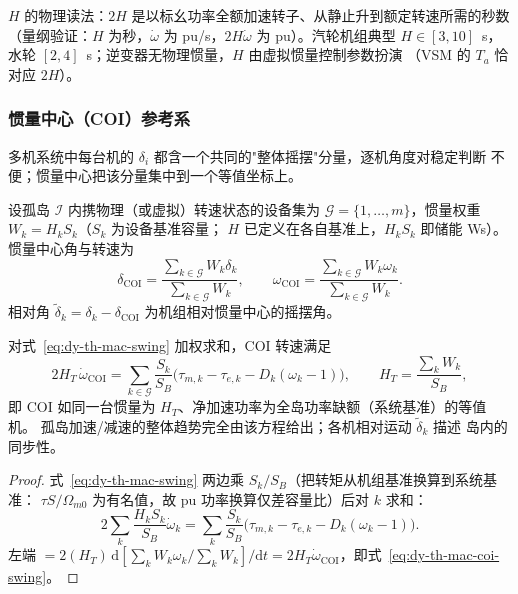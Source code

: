 $H$ 的物理读法：$2H$ 是以标幺功率全额加速转子、从静止升到额定转速所需的秒数
（量纲验证：$H$ 为秒，$\dot\omega$ 为 pu/s，$2H\dot\omega$ 为 pu）。汽轮机组典型
$H\in[3,10]$~s，水轮 $[2,4]$~s；逆变器无物理惯量，$H$ 由虚拟惯量控制参数扮演
（VSM 的 $T_a$ 恰对应 $2H$）。

\subsubsection{惯量中心（COI）参考系}

多机系统中每台机的 $\delta_i$ 都含一个共同的"整体摇摆"分量，逐机角度对稳定判断
不便；惯量中心把该分量集中到一个等值坐标上。

\begin{definition}[惯量中心]\label{def:dy-th-mac-coi}
设孤岛 $\mathcal I$ 内携物理（或虚拟）转速状态的设备集为
$\mathcal G=\{1,\dots,m\}$，惯量权重 $W_k=H_kS_k$（$S_k$ 为设备基准容量；
$H$ 已定义在各自基准上，$H_kS_k$ 即储能 Ws）。惯量中心角与转速为
\begin{equation}
\delta_{\mathrm{COI}}=\frac{\sum_{k\in\mathcal G}W_k\delta_k}{\sum_{k\in\mathcal G}W_k},
\qquad
\omega_{\mathrm{COI}}=\frac{\sum_{k\in\mathcal G}W_k\omega_k}{\sum_{k\in\mathcal G}W_k}.
\label{eq:dy-th-mac-coi}
\end{equation}
相对角 $\tilde\delta_k=\delta_k-\delta_{\mathrm{COI}}$ 为机组相对惯量中心的摇摆角。
\end{definition}

\begin{proposition}\label{prop:dy-th-mac-coi-swing}
对式~\eqref{eq:dy-th-mac-swing} 加权求和，COI 转速满足
\begin{equation}
2H_T\,\dot\omega_{\mathrm{COI}}
=\sum_{k\in\mathcal G}\frac{S_k}{S_B}\bigl(\tau_{m,k}-\tau_{e,k}-D_k(\omega_k-1)\bigr),
\qquad
H_T=\frac{\sum_kW_k}{S_B},
\label{eq:dy-th-mac-coi-swing}
\end{equation}
即 COI 如同一台惯量为 $H_T$、净加速功率为全岛功率缺额（系统基准）的等值机。
孤岛加速/减速的整体趋势完全由该方程给出；各机相对运动 $\tilde\delta_k$ 描述
岛内的同步性。
\end{proposition}

\begin{proof}
式~\eqref{eq:dy-th-mac-swing} 两边乘 $S_k/S_B$（把转矩从机组基准换算到系统基准：
$\tau S/\Omega_{m0}$ 为有名值，故 pu 功率换算仅差容量比）后对 $k$ 求和：
\begin{equation}
2\sum_k\frac{H_kS_k}{S_B}\dot\omega_k
=\sum_k\frac{S_k}{S_B}\bigl(\tau_{m,k}-\tau_{e,k}-D_k(\omega_k-1)\bigr).
\end{equation}
左端 $=2(H_T)\,\mathrm d\!\left[\sum_kW_k\omega_k/\sum_kW_k\right]/\mathrm dt
=2H_T\dot\omega_{\mathrm{COI}}$，即式~\eqref{eq:dy-th-mac-coi-swing}。
\end{proof}

